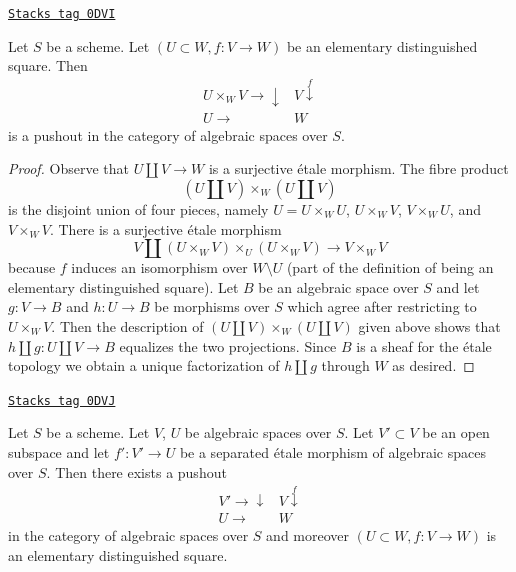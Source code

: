\begin{lemma}
\label{spaces-pushouts-lemma-elementary-distinguished-square-pushout}
\href{https://stacks.math.columbia.edu/tag/0DVI}{\texttt{Stacks tag 0DVI}}

Let $S$ be a scheme. Let $(U \subset W, f : V \to W)$ be
an elementary distinguished square. Then
$$
\begin{array}{cc}U \times_W V \longrightarrow\downarrow & V \overset{f}{\downarrow} \\ U \longrightarrow & W\end{array}
$$
is a pushout in the category of algebraic spaces over $S$.
\end{lemma}

\begin{proof}
Observe that $U \amalg V \to W$ is a surjective \'etale morphism.
The fibre product
$$
(U \amalg V) \times_W (U \amalg V)
$$
is the disjoint union of four pieces, namely
$U = U \times_W U$, $U \times_W V$, $V \times_W U$,
and $V \times_W V$.
There is a surjective \'etale morphism
$$
V \amalg (U \times_W V) \times_U (U \times_W V) \longrightarrow V \times_W V
$$
because $f$ induces an isomorphism over $W \setminus U$
(part of the definition of being an elementary distinguished square).
Let $B$ be an algebraic space over $S$ and let
$g : V \to B$ and $h : U \to B$ be morphisms over
$S$ which agree after restricting to $U \times_W V$.
Then the description of
$(U \amalg V) \times_W (U \amalg V)$ given above
shows that $h \amalg g : U \amalg V \to B$
equalizes the two projections. Since $B$ is a sheaf
for the \'etale topology we obtain a unique
factorization of $h \amalg g$ through $W$ as desired.
\end{proof}

\begin{lemma}
\label{spaces-pushouts-lemma-construct-elementary-distinguished-square}
\href{https://stacks.math.columbia.edu/tag/0DVJ}{\texttt{Stacks tag 0DVJ}}

Let $S$ be a scheme. Let $V$, $U$ be algebraic spaces over $S$.
Let $V' \subset V$ be an open subspace and let $f' : V' \to U$ be a
separated \'etale morphism of algebraic spaces over $S$.
Then there exists a pushout
$$
\begin{array}{cc}V' \longrightarrow\downarrow & V \overset{f}{\downarrow} \\ U \longrightarrow & W\end{array}
$$
in the category of algebraic spaces over $S$ and moreover
$(U \subset W, f : V \to W)$ is an elementary distinguished square.
\end{lemma}

